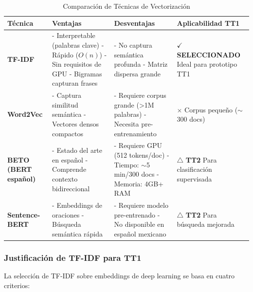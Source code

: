 \begin{table}[h]
\centering
\caption{Comparación de Técnicas de Vectorización}
\label{tab:vectorizacion_comparacion}
\begin{tabular}{|p{3cm}|p{4cm}|p{4cm}|p{3cm}|}
\hline
\textbf{Técnica} & \textbf{Ventajas} & \textbf{Desventajas} & \textbf{Aplicabilidad TT1} \\
\hline
\textbf{TF-IDF} & 
- Interpretable (palabras clave) \newline
- Rápido ($O(n)$) \newline
- Sin requisitos de GPU \newline
- Bigramas capturan frases & 
- No captura semántica profunda \newline
- Matriz dispersa grande & 
\textbf{$\checkmark$ SELECCIONADO} \newline
Ideal para prototipo TT1 \\
\hline
\textbf{Word2Vec} & 
- Captura similitud semántica \newline
- Vectores densos compactos & 
- Requiere corpus grande (>1M palabras) \newline
- Necesita pre-entrenamiento & 
$\times$ Corpus pequeño ($\sim$300 docs) \\
\hline
\textbf{BETO (BERT español)} & 
- Estado del arte en español \newline
- Comprende contexto bidireccional & 
- Requiere GPU (512 tokens/doc) \newline
- Tiempo: $\sim$5 min/300 docs \newline
- Memoria: 4GB+ RAM & 
$\triangle$ \textbf{TT2} \newline
Para clasificación supervisada \\
\hline
\textbf{Sentence-BERT} & 
- Embeddings de oraciones \newline
- Búsqueda semántica rápida & 
- Requiere modelo pre-entrenado \newline
- No disponible en español mexicano & 
$\triangle$ \textbf{TT2} \newline
Para búsqueda mejorada \\
\hline
\end{tabular}
\end{table}

\subsubsection{Justificación de TF-IDF para TT1}
\label{subsubsec:justificacion_tfidf}

La selección de TF-IDF sobre embeddings de deep learning se basa en cuatro criterios:

